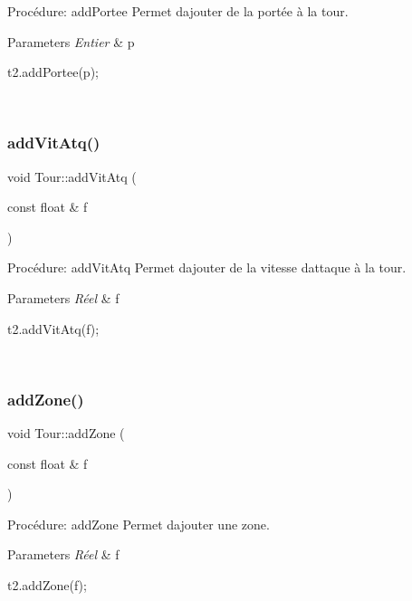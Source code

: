 Procédure\+: add\+Portee Permet d\textquotesingle{}ajouter de la portée à la tour. 


\begin{DoxyParams}{Parameters}
{\em Entier} & p 
\begin{DoxyCode}
t2.addPortee(p);
\end{DoxyCode}
 \\
\hline
\end{DoxyParams}
\mbox{\label{classTour_a49e73c0dc4bd90c3004be2c95693142a}} 
\subsubsection{\texorpdfstring{add\+Vit\+Atq()}{addVitAtq()}}
{\footnotesize\ttfamily void Tour\+::add\+Vit\+Atq (\begin{DoxyParamCaption}\item[{const float \&}]{f }\end{DoxyParamCaption})}



Procédure\+: add\+Vit\+Atq Permet d\textquotesingle{}ajouter de la vitesse d\textquotesingle{}attaque à la tour. 


\begin{DoxyParams}{Parameters}
{\em Réel} & f 
\begin{DoxyCode}
t2.addVitAtq(f);
\end{DoxyCode}
 \\
\hline
\end{DoxyParams}
\mbox{\label{classTour_a6c3050640d16281913269f73af884ad6}} 
\subsubsection{\texorpdfstring{add\+Zone()}{addZone()}}
{\footnotesize\ttfamily void Tour\+::add\+Zone (\begin{DoxyParamCaption}\item[{const float \&}]{f }\end{DoxyParamCaption})}



Procédure\+: add\+Zone Permet d\textquotesingle{}ajouter une zone. 


\begin{DoxyParams}{Parameters}
{\em Réel} & f 
\begin{DoxyCode}
t2.addZone(f);
\end{DoxyCode}
 \\
\hline
\end{DoxyParams}
\mbox{\label{classTour_abc82d80a3a618ed209fb288cee7c7a4e}} 
